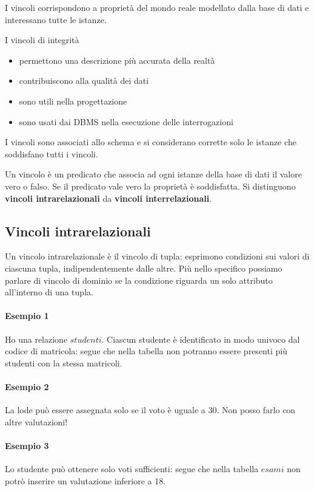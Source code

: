 \begin{definizione}I	vincoli corrispondono a proprietà del mondo reale modellato dalla base di dati e interessano tutte le istanze.
\end{definizione}
\noindent I vincoli di integrità
\begin{itemize}
	\item permettono una descrizione più accurata della realtà
	\item contribuiscono alla qualità dei dati
	\item sono utili nella progettazione
	\item sono usati dai DBMS nella esecuzione delle interrogazioni
\end{itemize}
I vincoli sono associati allo schema e si considerano corrette solo le istanze che soddisfano tutti i vincoli.
\begin{definizione}
	Un vincolo è un predicato che associa ad ogni istanze della base di dati il valore vero o falso. Se il predicato vale vero la proprietà è soddisfatta. Si distinguono \textbf{vincoli intrarelazionali} da \textbf{vincoli interrelazionali}.
\end{definizione}
\subsection{Vincoli intrarelazionali}
Un vincolo intrarelazionale è il vincolo di tupla: esprimono condizioni sui valori di ciascuna tupla, indipendentemente dalle altre. Più nello specifico possiamo parlare di vincolo di dominio se la condizione riguarda un solo attributo all'interno di una tupla.
\paragraph{Esempio 1} Ho una relazione $studenti$. Ciascun studente è identificato in modo univoco dal codice di matricola: segue che nella tabella non potranno essere presenti più studenti con la stessa matricoli.
\paragraph{Esempio 2} La lode può essere assegnata solo se il voto è uguale a 30. Non posso farlo con altre valutazioni!
\paragraph{Esempio 3} Lo studente può ottenere solo voti sufficienti: segue che nella tabella $esami$ non potrò inserire un valutazione inferiore a 18.

